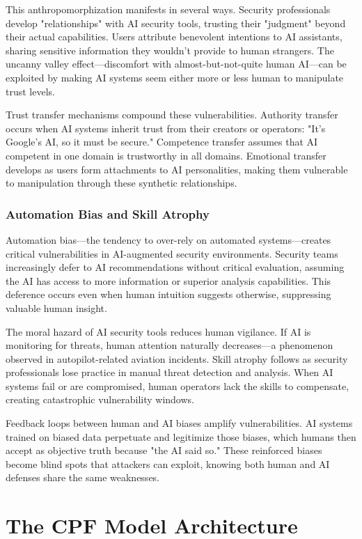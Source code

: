 \documentclass[manuscript,screen,review]{acmart}
\begin{document}
This anthropomorphization manifests in several ways. Security professionals develop "relationships" with AI security tools, trusting their "judgment" beyond their actual capabilities. Users attribute benevolent intentions to AI assistants, sharing sensitive information they wouldn't provide to human strangers. The uncanny valley effect—discomfort with almost-but-not-quite human AI—can be exploited by making AI systems seem either more or less human to manipulate trust levels.

Trust transfer mechanisms compound these vulnerabilities. Authority transfer occurs when AI systems inherit trust from their creators or operators: "It's Google's AI, so it must be secure." Competence transfer assumes that AI competent in one domain is trustworthy in all domains. Emotional transfer develops as users form attachments to AI personalities, making them vulnerable to manipulation through these synthetic relationships.

\subsubsection{Automation Bias and Skill Atrophy}

Automation bias—the tendency to over-rely on automated systems—creates critical vulnerabilities in AI-augmented security environments. Security teams increasingly defer to AI recommendations without critical evaluation, assuming the AI has access to more information or superior analysis capabilities. This deference occurs even when human intuition suggests otherwise, suppressing valuable human insight.

The moral hazard of AI security tools reduces human vigilance. If AI is monitoring for threats, human attention naturally decreases—a phenomenon observed in autopilot-related aviation incidents. Skill atrophy follows as security professionals lose practice in manual threat detection and analysis. When AI systems fail or are compromised, human operators lack the skills to compensate, creating catastrophic vulnerability windows.

Feedback loops between human and AI biases amplify vulnerabilities. AI systems trained on biased data perpetuate and legitimize those biases, which humans then accept as objective truth because "the AI said so." These reinforced biases become blind spots that attackers can exploit, knowing both human and AI defenses share the same weaknesses.

\section{The CPF Model Architecture}
\end{document}
